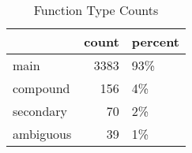 \begin{table}[htbp!]
\centering
\caption{Function Type Counts}
\label{table:ALL_functype_cp}
\begin{tabular}{lrl}
\toprule
{} &  count & percent \\
\midrule
main      &   3383 &     93\% \\
compound  &    156 &      4\% \\
secondary &     70 &      2\% \\
ambiguous &     39 &      1\% \\
\bottomrule
\end{tabular}
\end{table}
